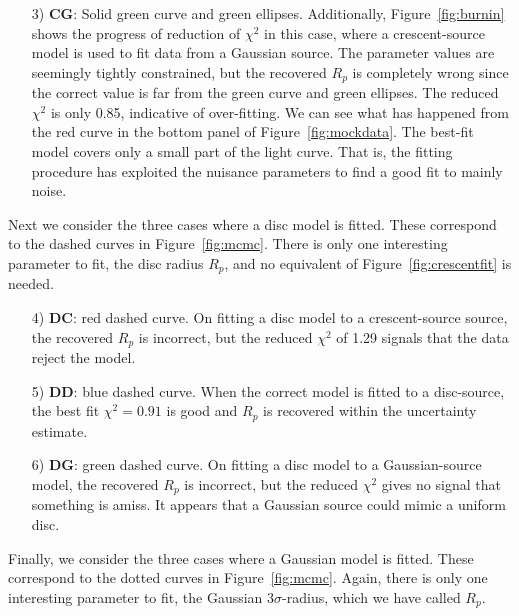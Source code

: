 \documentclass[usenatbib]{mn2e}
\begin{document}
\begin{enumerate}
\item[3) {\bf CG}:] Solid green curve and green ellipses.
  Additionally, Figure~\ref{fig:burnin} shows the progress of
  reduction of $\chi^2$ in this case, where a crescent-source model is
  used to fit data from a Gaussian source.  The parameter values are
  seemingly tightly constrained, but the recovered $R_p$ is completely
  wrong since the correct value is far from the green curve and green
  ellipses.  The reduced $\chi^2$ is only 0.85, indicative of
  over-fitting.  We can see what has happened from the red curve in
  the bottom panel of Figure~\ref{fig:mockdata}.  The best-fit model
  covers only a small part of the light curve.  That is, the fitting
  procedure has exploited the nuisance parameters to find a good fit
  to mainly noise.

\end{enumerate}

Next we consider the three cases where a disc model is fitted.  These
correspond to the dashed curves in Figure~\ref{fig:mcmc}.  There is
only one interesting parameter to fit, the disc radius $R_p$, and no
equivalent of Figure~\ref{fig:crescentfit} is needed. 

\begin{enumerate}

\item[4) {\bf DC}:] red dashed curve.  On fitting a disc model to a
  crescent-source source, the recovered $R_p$ is incorrect, but the
  reduced $\chi^2$ of 1.29 signals that the data reject the model.

\item[5) {\bf DD}:] blue dashed curve.  When the correct model is
  fitted to a disc-source, the best fit $\chi^2=0.91$ is good and
  $R_p$ is recovered within the uncertainty estimate.

\item[6) {\bf DG}:] green dashed curve.  On fitting a disc model to a
  Gaussian-source model, the recovered $R_p$ is incorrect, but the
  reduced $\chi^2$ gives no signal that something is amiss.  It
  appears that a Gaussian source could mimic a uniform disc.

\end{enumerate}

Finally, we consider the three cases where a Gaussian model is fitted.
These correspond to the dotted curves in Figure~\ref{fig:mcmc}.  Again,
there is only one interesting parameter to fit, the Gaussian
$3\sigma$-radius, which we have called $R_p$.
\end{document}
